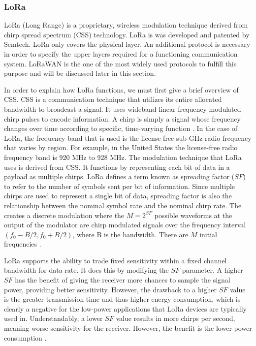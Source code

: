 \subsubsection{LoRa}
LoRa (Long Range) is a proprietary, wireless modulation technique derived from chirp spread spectrum (CSS) technology. LoRa is was developed and patented by Semtech. LoRa only covers the physical layer. An additional protocol is necessary in order to specify the upper layers required for a functioning communication system. LoRaWAN is the one of the most widely used protocols to fulfill this purpose and will be discussed later in this section.

In order to explain how LoRa functions, we must first give a brief overview of CSS. CSS is a communication technique that utilizes its entire allocated bandwidth to broadcast a signal. It uses wideband linear frequency modulated chirp pulses to encode information. A chirp is simply a signal whose frequency changes over time according to specific, time-varying function \cite{ieee-std-chirp}. In the case of LoRa, the frequency band that is used is the license-free sub-GHz radio frequency that varies by region. For example, in the United States the license-free radio frequency band is 920 MHz to 928 MHz. The modulation technique that LoRa uses is derived from CSS. It functions by representing each bit of data in a payload as multiple chirps. LoRa defines a term known as spreading factor ($SF$) to refer to the number of symbols sent per bit of information. Since multiple chirps are used to represent a single bit of data, spreading factor is also the relationship between the nominal symbol rate and the nominal chirp rate. The creates a discrete modulation where the $M=2^{SF}$ possible waveforms at the output of the modulator are chirp modulated signals over the frequency interval $(f_0 - B/2, f_0 + B/2)$, where B is the bandwidth. There are $M$ initial frequencies \cite{ieee-lora-modulation}.

LoRa supports the ability to trade fixed sensitivity within a fixed channel bandwidth for data rate. It does this by modifying the $SF$ parameter. A higher $SF$ has the benefit of giving the receiver more chances to sample the signal power, providing better sensitivity. However, the drawback to a higher $SF$ value is the greater transmission time and thus higher energy consumption, which is clearly a negative for the low-power applications that LoRa devices are typically used in. Understandably, a lower $SF$ value results in more chirps per second, meaning worse sensitivity for the receiver. However, the benefit is the lower power consumption \cite{ttn-spreading-factor}.

